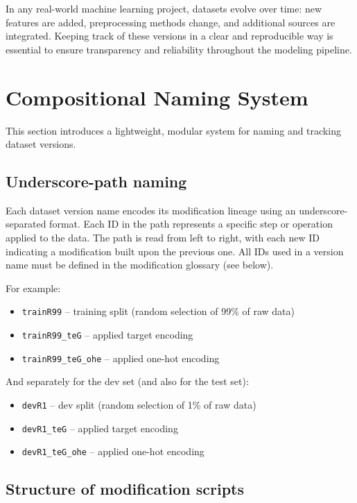 \documentclass[12pt,openany]{book}
\begin{document}
In any real-world machine learning project, datasets evolve over time: new features are added, preprocessing methods change, and additional sources are integrated. Keeping track of these versions in a clear and reproducible way is essential to ensure transparency and reliability throughout the modeling pipeline.



\section{Compositional Naming System}

This section introduces a lightweight, modular system for naming and tracking dataset versions.


\subsection{Underscore-path naming}

Each dataset version name encodes its modification lineage using an underscore-separated format. Each ID in the path represents a specific step or operation applied to the data. The path is read from left to right, with each new ID indicating a modification built upon the previous one. All IDs used in a version name must be defined in the modification glossary (see below).
\newline

For example:

\begin{itemize}
    \item \texttt{trainR99} -- training split (random selection of 99\% of raw data)
    \item \texttt{trainR99\_teG} -- applied target encoding
    \item \texttt{trainR99\_teG\_ohe} -- applied one-hot encoding
\end{itemize}

And separately for the dev set (and also for the test set):

\begin{itemize}
    \item \texttt{devR1} -- dev split (random selection of 1\% of raw data)
    \item \texttt{devR1\_teG} -- applied target encoding
    \item \texttt{devR1\_teG\_ohe} -- applied one-hot encoding
\end{itemize}


\subsection{Structure of modification scripts}
\end{document}
